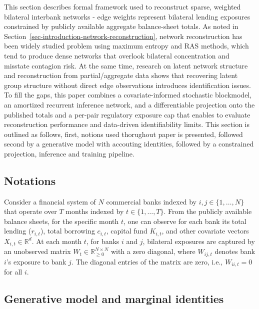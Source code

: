 \documentclass[
  a4paper,
]{article}
\begin{document}
This section describes formal framework used to reconstruct sparse,
weighted bilateral interbank networks - edge weights represent bilateral
lending exposures constrained by publicly available aggregate
balance-sheet totals. As noted in
Section~\ref{sec-introduction-network-reconstruction}, network
reconstruction has been widely studied problem using maximum entropy and
RAS methods, which tend to produce dense networks that overlook
bilateral concentration and misstate contagion risk. At the same time,
research on latent network structure and reconstruction from
partial/aggregate data shows that recovering latent group structure
without direct edge observations introduces identification issues. To
fill the gaps, this paper combines a covariate-informed stochastic
blockmodel, an amortized recurrent inference network, and a
differentiable projection onto the published totals and a per-pair
regulatory exposure cap that enables to evaluate reconstruction
performance and data-driven identifiability limits. This section is
outlined as follows, first, notions used thorughout paper is presented,
followed second by a generative model with accouting identities,
followed by a constrained projection, inference and training pipeline.

\subsection{Notations}\label{sec-methodology-notations}

Consider a financial system of \(N\) commercial banks indexed by
\(i, j \in \{1,\dots,N\}\) that operate over \(T\) months indexed by
\(t \in \{1,\dots,T\}\). From the publicly available balance sheets, for
the specific month \(t\), one can observe for each bank its total
lending (\(r_{i,t}\)), total borrowing \(c_{i,t}\), capital fund
\(K_{i,t}\), and other covariate vectors \(X_{i,t} \in \mathbb{R}^d\).
At each month \(t\), for banks \(i\) and \(j\), bilateral exposures are
captured by an unobserved matrix
\(W_t \in \mathbb{R}^{N\times N}_{\ge 0}\) with a zero diagonal, where
\(W_{ij,t}\) denotes bank \(i\)'s exposure to bank \(j\). The diagonal
entries of the matrix are zero, i.e., \(W_{ii,t} = 0\) for all \(i\).

\subsection{Generative model and marginal
identities}\label{sec-methodology-generative-model-marginal-identities}
\end{document}
